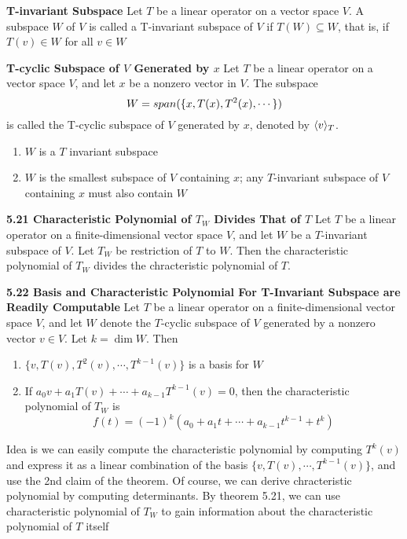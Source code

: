 \documentclass[11pt]{article}
\begin{document}
\begin{defn*}
    \textbf{T-invariant Subspace} Let $T$ be a linear operator on a vector space $V$. A subspace $W$ of $V$ is called a T-invariant subspace of $V$ if $T(W) \subseteq W$, that is, if $T(v)\in W$ for all $v\in W$
\end{defn*}

\begin{defn*}
    \textbf{T-cyclic Subspace of $V$ Generated by $x$} Let $T$ be a linear operator on a vector space $V$, and let $x$ be a nonzero vector in $V$. The subspace 
    \[
        W = \span{\{x, T(x), T^2(x), \cdots\}}    
    \]
    is called the T-cyclic subspace of $V$ generated by $x$, denoted by $\tinvariant{T}{v}$. 
    \begin{enumerate}
        \item $W$ is a $T$ invariant subspace 
        \item $W$ is the smallest subspace of $V$ containing $x$; any $T$-invariant subspace of $V$ containing $x$ must also contain $W$
    \end{enumerate}
\end{defn*}

 

\begin{theorem*}
    \textbf{5.21 Characteristic Polynomial of $T_W$ Divides That of $T$} Let $T$ be a linear operator on a finite-dimensional vector space $V$, and let $W$ be a $T$-invariant subspace of $V$. Let $T_W$ be restriction of $T$ to $W$. Then the characteristic polynomial of $T_W$ divides the chracteristic polynomial of $T$.
\end{theorem*}


\begin{theorem*}
    \textbf{5.22 Basis and Characteristic Polynomial For T-Invariant Subspace are Readily Computable}
    Let $T$ be a linear operator on a finite-dimensional vector space $V$, and let $W$ denote the $T$-cyclic subspace of $V$ generated by a nonzero vector $v\in V$. Let $k = \dim{W}$. Then 
    \begin{enumerate}
        \item $\{v, T(v), T^2(v), \cdots, T^{k-1}(v)\}$ is a basis for $W$ 
        \item If $a_0v + a_1T(v) + \cdots + a_{k-1}T^{k-1}(v) = 0$, then the characteristic polynomial of $T_W$ is 
        \[
            f(t) = (-1)^k(a_0 + a_1t + \cdots + a_{k-1}t^{k-1} + t^k)
        \]
    \end{enumerate}
    Idea is we can easily compute the characteristic polynomial by computing $T^k(v)$ and express it as a linear combination of the basis $\{v, T(v), \cdots, T^{k-1}(v)\}$, and use the 2nd claim of the theorem. Of course, we can derive chracteristic polynomial by computing determinants. By theorem 5.21, we can use characteristic polynomial of $T_W$ to gain information about the characteristic polynomial of $T$ itself
\end{theorem*}
\end{document}
